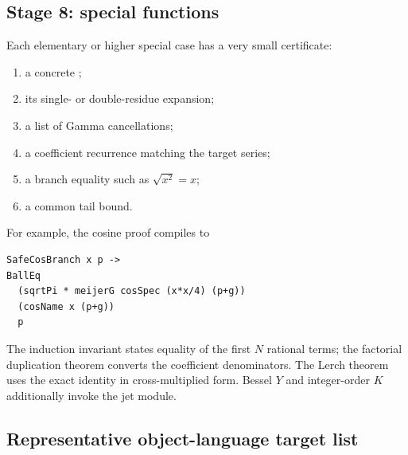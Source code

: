 \subsection{Stage 8: special functions}

Each elementary or higher special case has a very small certificate:
\begin{enumerate}
\item a concrete ;
\item its single- or double-residue expansion;
\item a list of Gamma cancellations;
\item a coefficient recurrence matching the target series;
\item a branch equality such as $\sqrt{x^2}=x$;
\item a common tail bound.
\end{enumerate}
For example, the cosine proof compiles to
\begin{lstlisting}[language={}]
SafeCosBranch x p ->
BallEq
  (sqrtPi * meijerG cosSpec (x*x/4) (p+g))
  (cosName x (p+g))
  p
\end{lstlisting}
The induction invariant states equality of the first $N$ rational terms; the
factorial duplication theorem converts the coefficient denominators.  The
Lerch theorem uses the exact identity
 in cross-multiplied form.  Bessel
$Y$ and integer-order $K$ additionally invoke the jet module.

\subsection{Representative object-language target list}

